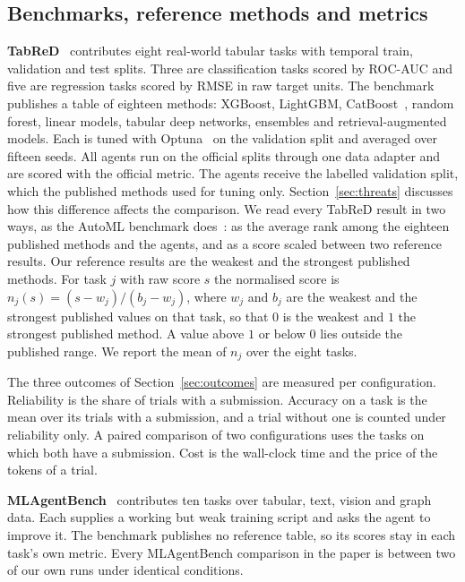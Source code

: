 \subsection{Benchmarks, reference methods and metrics}
\label{sec:benchmarks}

\textbf{TabReD}~\citep{rubachev2024tabred} contributes eight real-world
tabular tasks with temporal train, validation and test splits. Three are
classification tasks scored by ROC-AUC and five are regression tasks scored
by RMSE in raw target units. The benchmark publishes a table of eighteen
methods:
XGBoost, LightGBM, CatBoost~\citep{chen2016xgboost,ke2017lightgbm,prokhorenkova2018catboost},
random forest, linear models, tabular deep networks, ensembles and
retrieval-augmented models. Each is tuned with
Optuna~\citep{akiba2019optuna} on the validation split and averaged over
fifteen seeds. All agents run on
the official splits through one data adapter and are scored with the
official metric. The agents receive the labelled validation split, which
the published methods used for tuning only. Section~\ref{sec:threats}
discusses how this difference affects the comparison. We read every TabReD
result in two ways, as the AutoML benchmark does~\citep{gijsbers2024amlb}:
as the average rank among the eighteen published methods and the agents,
and as a score scaled between two reference results. Our reference results
are the weakest and the strongest published methods. For task $j$ with raw score $s$ the normalised score
is $n_j(s) = (s - w_j)/(b_j - w_j)$, where $w_j$ and $b_j$ are the weakest and
the strongest published values on that task, so that $0$ is the weakest and
$1$ the strongest published method. A value above $1$ or below $0$ lies
outside the published range. We report the mean of $n_j$ over the eight
tasks.

The three outcomes of Section~\ref{sec:outcomes} are measured per
configuration. Reliability is the share of trials with a submission.
Accuracy on a task is the mean over its trials with a submission, and a
trial without one is counted under reliability only. A paired comparison of
two configurations uses the tasks on which both have a submission. Cost is
the wall-clock time and the price of the tokens of a trial.

\textbf{MLAgentBench}~\citep{huang2024mlagentbench} contributes ten tasks
over tabular, text, vision and graph data. Each supplies a working but weak
training script and asks the agent to improve it. The benchmark publishes no
reference table, so its scores stay in each task's own metric. Every
MLAgentBench comparison in the paper is between two of our own runs under
identical conditions.

